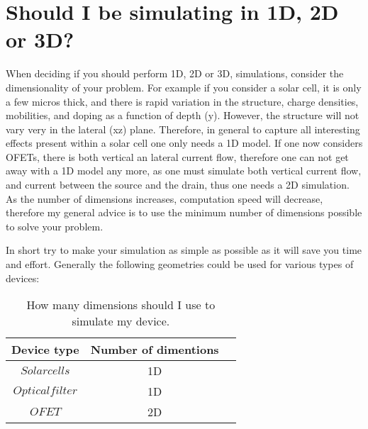 \section{Should I be simulating in 1D, 2D or 3D?}
When deciding if you should perform 1D, 2D or 3D, simulations, consider the dimensionality of your problem.  For example if you consider a solar cell, it is only a few micros thick, and there is rapid variation in the structure, charge densities, mobilities, and doping as a function of depth (y).  However, the structure will not vary very in the lateral (xz) plane.  Therefore, in general  to capture all interesting effects present within a solar cell one only needs a 1D model.  If one now considers OFETs, there is both vertical an lateral current flow, therefore one can not get away with a 1D model any more, as one must simulate both vertical current flow, and current between the source and the drain, thus one needs a 2D simulation.  As the number of dimensions increases, computation speed will decrease, therefore my general advice is to use the minimum number of dimensions possible to solve your problem.

In short try to make your simulation as simple as possible as it will save you time and effort.  Generally the following geometries could be used for various types of devices:

\begin{table}[H]
\begin{center}
\begin{tabular}{ |c|c|c| } 
 \hline
	Device type			& 	Number of dimentions  \\ 
 \hline
	$Solar cells$ 		&	1D \\ 
	$Optical filter$	&	1D\\ 
	$OFET$ 				&	2D\\ 
 \hline
\end{tabular}
\caption{How many dimensions should I use to simulate my device.}
\end{center}
\end{table}


